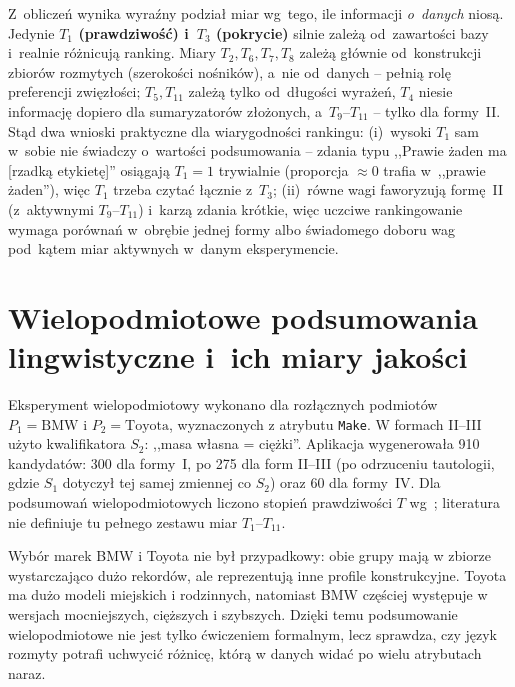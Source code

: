 \documentclass{article}
\begin{document}
Z~obliczeń wynika wyraźny podział miar wg~tego, ile informacji
\emph{o~danych} niosą. Jedynie \textbf{$T_1$ (prawdziwość) i~$T_3$
(pokrycie)} silnie zależą od~zawartości bazy i~realnie różnicują ranking.
Miary $T_2, T_6, T_7, T_8$ zależą głównie od~konstrukcji zbiorów rozmytych
(szerokości nośników), a~nie od~danych -- pełnią rolę preferencji zwięzłości;
$T_5, T_{11}$ zależą tylko od~długości wyrażeń, $T_4$ niesie informację
dopiero dla sumaryzatorów złożonych, a~$T_9$--$T_{11}$ -- tylko dla formy~II.
Stąd dwa wnioski praktyczne dla wiarygodności rankingu: (i)~wysoki $T_1$ sam
w~sobie nie świadczy o~wartości podsumowania -- zdania typu ,,Prawie żaden ma
[rzadką etykietę]'' osiągają $T_1 = 1$ trywialnie (proporcja $\approx 0$
trafia w~,,prawie żaden''), więc $T_1$ trzeba czytać łącznie z~$T_3$;
(ii)~równe wagi faworyzują formę~II (z~aktywnymi $T_9$--$T_{11}$) i~karzą
zdania krótkie, więc uczciwe rankingowanie wymaga porównań w~obrębie jednej
formy albo świadomego doboru wag pod~kątem miar aktywnych w~danym eksperymencie.

\section{Wielopodmiotowe podsumowania lingwistyczne i~ich miary jakości}

Eksperyment wielopodmiotowy wykonano dla rozłącznych podmiotów
$P_1=\text{BMW}$ i $P_2=\text{Toyota}$, wyznaczonych z atrybutu
\texttt{Make}. W formach II--III użyto kwalifikatora $S_2$: ,,masa własna
= ciężki''. Aplikacja wygenerowała 910 kandydatów: 300 dla formy~I, po 275
dla form II--III (po odrzuceniu tautologii, gdzie $S_1$ dotyczył tej samej
zmiennej co $S_2$) oraz 60 dla formy~IV. Dla podsumowań wielopodmiotowych
liczono stopień prawdziwości $T$ wg~\cite{superson14}; literatura nie
definiuje tu pełnego zestawu miar $T_1$--$T_{11}$.

Wybór marek BMW i Toyota nie był przypadkowy: obie grupy mają w zbiorze
wystarczająco dużo rekordów, ale reprezentują inne profile konstrukcyjne.
Toyota ma dużo modeli miejskich i rodzinnych, natomiast BMW częściej
występuje w wersjach mocniejszych, cięższych i szybszych. Dzięki temu
podsumowanie wielopodmiotowe nie jest tylko ćwiczeniem formalnym, lecz
sprawdza, czy język rozmyty potrafi uchwycić różnicę, którą w danych
widać po wielu atrybutach naraz.
\end{document}
